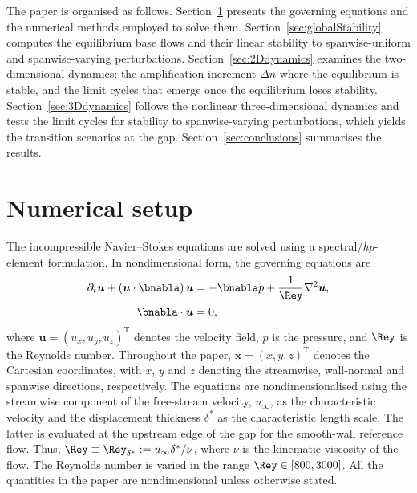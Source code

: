 \documentclass[lineno]{jfm}
\newcommand\dstar{{\delta^*}} %
\begin{document}
The paper is organised as follows. Section~\ref{sec:numericalSetup} presents the governing equations and the numerical methods employed to solve them. Section~\ref{sec:globalStability} computes the equilibrium base flows and their linear stability to spanwise-uniform and spanwise-varying perturbations. Section~\ref{sec:2Ddynamics} examines the two-dimensional dynamics: the amplification increment $\Delta n$ where the equilibrium is stable, and the limit cycles that emerge once the equilibrium loses stability. Section~\ref{sec:3Ddynamics} follows the nonlinear three-dimensional dynamics and tests the limit cycles for stability to spanwise-varying perturbations, which yields the transition scenarios at the gap. Section~\ref{sec:conclusions} summarises the results.

\section{Numerical setup}\label{sec:numericalSetup}
The incompressible Navier--Stokes equations are solved using a spectral/\textit{hp}-element formulation. In nondimensional form, the governing equations are
\begin{equation}\label{eq:ns}
	\begin{aligned}
		\partial_t \boldsymbol{u} + (\boldsymbol{u}\cdot\bnabla)\,\boldsymbol{u} & = -\bnabla p + \frac{1}{\Rey} \nabla^2 \boldsymbol{u}, \\
		\bnabla \cdot \boldsymbol{u}                                       & = 0,
	\end{aligned}
\end{equation}
where $\boldsymbol{u}={(u_x,u_y,u_z)}^\mathrm{T}$ denotes the velocity field, $p$ is the pressure, and $\Rey$ is the Reynolds number. Throughout the paper, $\boldsymbol{x}={(x,y,z)}^\mathrm{T}$ denotes the Cartesian coordinates, with $x$, $y$ and $z$ denoting the streamwise, wall-normal and spanwise directions, respectively. The equations are nondimensionalised using the streamwise component of the free-stream velocity, $u_\infty$, as the characteristic velocity and the displacement thickness $\dstar$ as the characteristic length scale. The latter is evaluated at the upstream edge of the gap for the smooth-wall reference flow. Thus,
$
	\Rey \equiv \Rey_\dstar := u_\infty \dstar/\nu
$,
where $\nu$ is the kinematic viscosity of the flow. The Reynolds number is varied in the range $\Rey \in [800,3000]$. All the quantities in the paper are nondimensional unless otherwise stated.
\end{document}
